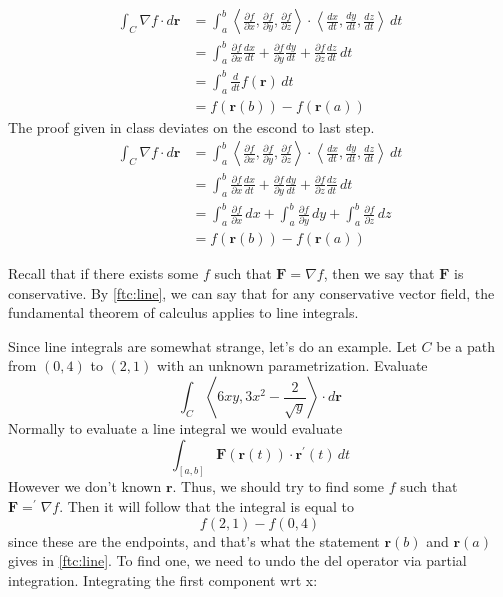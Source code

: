 \begin{intuition}
\begin{longproof}
\begin{align*}
        \int_C \nabla f\cdot d \mathbf{r}&=\int_a^b \left\langle \frac{\partial f}{\partial x},\frac{\partial f}{\partial y},\frac{\partial f}{\partial z}    \right\rangle \cdot \left\langle \frac{dx}{dt},\frac{dy}{dt},\frac{dz}{dt} \right\rangle \,dt\\
        &=\int_a^b \frac{\partial f}{\partial x} \frac{dx}{dt} + \frac{\partial f}{\partial y} \frac{dy}{dt} +\frac{\partial f}{\partial z} \frac{dz}{dt} \,dt\\
        &=\int_a^b \frac{d}{dt}f(\mathbf{r})\,dt\\
        &= f(\mathbf{r}(b))-f(\mathbf{r}(a))
    \end{align*}
    The proof given in class deviates on the escond to last step.
    \begin{align*}
        \int_C \nabla f\cdot d \mathbf{r}&=\int_a^b \left\langle \frac{\partial f}{\partial x},\frac{\partial f}{\partial y},\frac{\partial f}{\partial z}    \right\rangle \cdot \left\langle \frac{dx}{dt},\frac{dy}{dt},\frac{dz}{dt} \right\rangle \,dt\\
        &=\int_a^b \frac{\partial f}{\partial x} \frac{dx}{dt} + \frac{\partial f}{\partial y} \frac{dy}{dt} +\frac{\partial f}{\partial z} \frac{dz}{dt} \,dt\\
        &=\int_a^b \frac{\partial f}{\partial x}\,dx +  \int_a^b \frac{\partial f}{\partial y}\,dy + \int_a^b \frac{\partial f}{\partial z}\,dz\\
        &= f(\mathbf{r}(b))-f(\mathbf{r}(a))
    \end{align*}
\end{longproof}
Recall that if there exists some \(f\) such that \(\mathbf{F}=\nabla f\), then we say that \(\mathbf{F}\) is conservative. By \ref{ftc:line}, we can say that for any conservative vector field, the fundamental theorem of calculus applies to line integrals. 
\begin{eg}
    Since line integrals are somewhat strange, let's do an example. Let \(C\) be a path from \((0,4)\) to \((2,1)\) with an unknown parametrization. Evaluate
    \[
        \int_C \left\langle 6xy,3x^2 -\frac{2}{\sqrt{y} } \right\rangle \cdot d \mathbf{r}
    \]
    Normally to evaluate a line integral we would evaluate
    \[
        \int_{[a,b]}\mathbf{F}(\mathbf{r}(t))\cdot \mathbf{r}^{\prime} (t)\,dt
    \]
    However we don't known \(\mathbf{r}\). Thus, we should try to find some \(f\) such that \(\mathbf{F}=^{\prime}\nabla f\). Then it will follow that the integral is equal to
    \[
        f(2,1)-f(0,4)
    \]
    since these are the endpoints, and that's what the statement \(\mathbf{r}(b)\) and \(\mathbf{r}(a)\) gives in \ref{ftc:line}. To find one, we need to undo the del operator via partial integration. Integrating the first component wrt x:

\end{eg}
\end{intuition}
